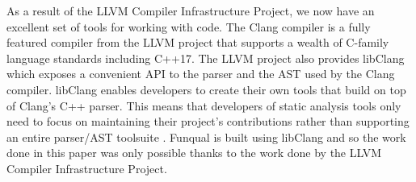 As a result of the LLVM Compiler Infrastructure Project, we now have an excellent set of tools for working with code.  The Clang compiler is a fully featured compiler from the LLVM project that supports a wealth of C-family language standards including C++17.  The LLVM project also provides libClang which exposes a convenient API to the parser and the AST used by the Clang compiler.  libClang enables developers to create their own tools that build on top of Clang's C++ parser.  This means that developers of static analysis tools only need to focus on maintaining their project's contributions rather than supporting an entire parser/AST toolsuite \cite{libclang-survey}.  Funqual is built using libClang and so the work done in this paper was only possible thanks to the work done by the LLVM Compiler Infrastructure Project.  
